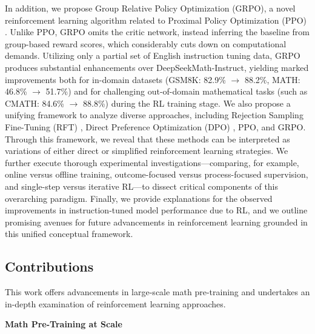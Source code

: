 In addition, we propose Group Relative Policy Optimization (GRPO), a novel reinforcement learning algorithm related to Proximal Policy Optimization (PPO) \citep{schulman2017proximal}. Unlike PPO, GRPO omits the critic network, instead inferring the baseline from group-based reward scores, which considerably cuts down on computational demands. Utilizing only a partial set of English instruction tuning data, GRPO produces substantial enhancements over DeepSeekMath-Instruct, yielding marked improvements both for in-domain datasets (GSM8K: 82.9\% $\rightarrow$ 88.2\%, MATH: 46.8\% $\rightarrow$ 51.7\%) and for challenging out-of-domain mathematical tasks (such as CMATH: 84.6\% $\rightarrow$ 88.8\%) during the RL training stage. We also propose a unifying framework to analyze diverse approaches, including Rejection Sampling Fine-Tuning (RFT) \citep{yuan2023scaling}, Direct Preference Optimization (DPO) \citep{dpo}, PPO, and GRPO. Through this framework, we reveal that these methods can be interpreted as variations of either direct or simplified reinforcement learning strategies. We further execute thorough experimental investigations—comparing, for example, online versus offline training, outcome-focused versus process-focused supervision, and single-step versus iterative RL—to dissect critical components of this overarching paradigm. Finally, we provide explanations for the observed improvements in instruction-tuned model performance due to RL, and we outline promising avenues for future advancements in reinforcement learning grounded in this unified conceptual framework.

\subsection{Contributions}
This work offers advancements in large-scale math pre-training and undertakes an in-depth examination of reinforcement learning approaches.

\textbf{Math Pre-Training at Scale}

